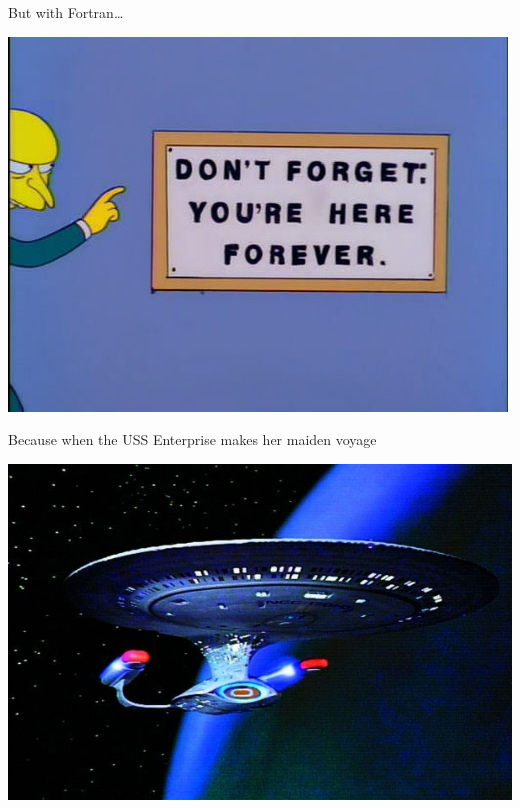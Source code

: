 \begin{frame}
  \begin{block}{But with Fortran\dots}
    \begin{center}
      \includegraphics[scale=.5]{pics/here_forever}
    \end{center}
  \end{block}
\end{frame}

\begin{frame}
  \begin{block}{Because when the USS Enterprise makes her maiden voyage}
    \begin{center}
      \includegraphics[scale=2]{pics/enterprise}
    \end{center}
  \end{block}
\end{frame}

